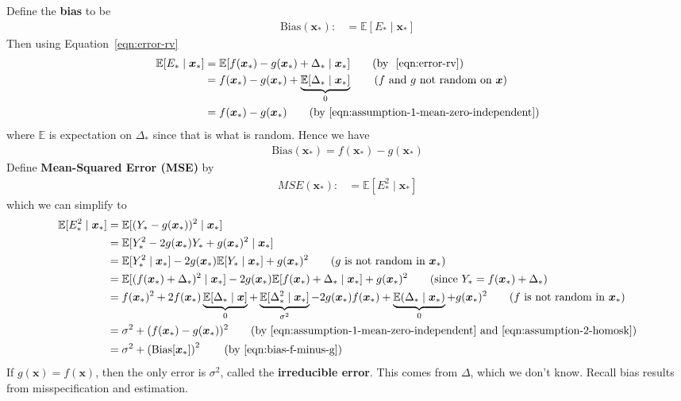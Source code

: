 \documentclass[12pt, a4paper]{article}
\theoremstyle{definition}
\begin{document}
	Define the \textbf{bias} to be
	\begin{align}
		\text{Bias}(\bm{x}_*):
		&= \mathbb{E}[E_* \mid \bm{x}_*]
		\label{eqn:def-bias}
	\end{align}
	Then using Equation~\ref{eqn:error-rv}
	\begin{align*}
		\mathbb{E}[E_* \mid \bm{x}_*]
		& = \mathbb{E}[f(\bm{x}_*) - g(\bm{x}_*) + \Delta_* \mid \bm{x}_*]
		\tag{by ~\ref{eqn:error-rv}}\\
		& = f(\bm{x}_*) - g(\bm{x}_*) + \underbrace{\mathbb{E}[\Delta_* \mid \bm{x}_*]}_{0}
		\tag{$f$ and $g$ not random on $\bm{x}$}\\
		& = f(\bm{x}_*) - g(\bm{x}_*)
		\tag{by \ref{eqn:assumption-1-mean-zero-independent}}
	\end{align*}
	where $\mathbb{E}$ is expectation on $\Delta_*$ since that is what is random.
	Hence we have
	\begin{align}
		\text{Bias}(\bm{x}_*) = f(\bm{x}_*) - g(\bm{x}_*)
		\label{eqn:bias-f-minus-g}
	\end{align}
	Define \textbf{Mean-Squared Error (MSE)} by
	\begin{align}
		MSE(\bm{x}_*):
		&= \mathbb{E}[E_*^2 \mid \bm{x}_*]\label{eqn:-def-MSE}
	\end{align}
	which we can simplify to
	\begin{align*}
		\mathbb{E}[E_*^2 \mid \bm{x}_*]
		&=\mathbb{E}[(Y_* - g(\bm{x}_*))^2 \mid \bm{x}_*]\\
		&= \mathbb{E}[Y_*^2 - 2g(\bm{x}_*)Y_* + g(\bm{x}_*)^2 \mid \bm{x}_*]\\
		&= \mathbb{E}[Y_*^2 \mid \bm{x}_*] -2g(\bm{x}_*) \mathbb{E}[Y_* \mid \bm{x}_*] + g(\bm{x}_*)^2
		\tag{$g$ is not random in $\bm{x}_*$}\\
		&= \mathbb{E}[(f(\bm{x}_*) + \Delta_*)^2 \mid \bm{x}_*]
		- 2g(\bm{x}_*)\mathbb{E}[f(\bm{x}_*) + \Delta_* \mid \bm{x}_*] + g(\bm{x}_*)^2
		\tag{since $Y_* = f(\bm{x}_*) + \Delta_*$}\\
		&=  f(\bm{x}_*)^2 + 2 f(\bm{x}_*) \underbrace{\mathbb{E}[\Delta_* \mid \bm{x}]}_{0} +\underbrace{\mathbb{E}[\Delta_*^2 \mid \bm{x}_*]}_{\sigma^2}
		-2g(\bm{x}_*)f(\bm{x}_*) + \underbrace{\mathbb{E}(\Delta_* \mid \bm{x}_*)}_{0} + g(\bm{x}_*)^2
		\tag{$f$ is not random in $\bm{x}_*$}\\
		&=\sigma^2 + (f(\bm{x}_*) - g(\bm{x}_*))^2
		\tag{by \ref{eqn:assumption-1-mean-zero-independent} and \ref{eqn:assumption-2-homosk}}\\
		&=\sigma^2 +\left( \text{Bias}[\bm{x}_*]\right)^2
		\tag{by \ref{eqn:bias-f-minus-g}}
	\end{align*}
	If $g(\bm{x}) = f(\bm{x})$, then the only error is $\sigma^2$, called the
	\textbf{irreducible error}. This comes from $\Delta$, which we don't know.
	Recall bias results from misspecification and estimation.
\end{document}
